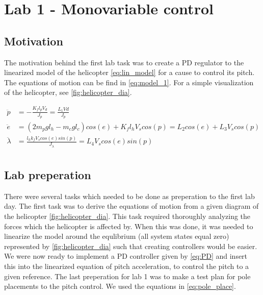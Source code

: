 \section{Lab 1 - Monovariable control}
\subsection{Motivation}\label{sec:lab1_mot}
The motivation behind the first lab task was to create a PD regulator to the linearized
model of the helicopter \ref{eq:lin_model} for a cause to control its pitch. The equations
of motion can be find in \ref{eq:model_1}. For a simple visualization of the helicopter, see \ref{fig:helicopter_dia}.

\begin{subequations}\label{eq:model_1}
	\begin{align}
		\ddot{p}  &= -\frac{K_{f}l_{p}V_{d}}{J_{p}} = \frac{L_1Vd}{J_p} \label{eq:model_1_p} \\
		\ddot{e}  &= (2m_pgl_h-m_cgl_c)cos(e)+K_fl_hV_scos(p) = L_2cos(e)+L_3V_scos(p)\label{eq:model_1_e} \\
		\ddot{\lambda} &= \frac{l_hk_fV_scos(e)sin(p)}{J_{\lambda}} = L_4V_scos(e)sin(p) \label{eq:model_1_l} \\
	\end{align}
\end{subequations}

\subsection{Lab preperation}\label{sec:lab1_prep}
There were several tasks which needed to be done as preperation to the first lab day.
The first task was to derive the equations of motion from a given diagram of the helicopter \ref{fig:helicopter_dia}.
This task required thoroughly analyzing the forces which the helicopter is affected by.
When this was done, it was needed to linearize the model around the equlibrium (all system states equal zero) represented by \ref{fig:helicopter_dia} such that 
creating controllers would be easier. We were now ready to implement a PD controller given by \ref{eq:PD}
and insert this into the linearized equation of pitch acceleration, to control the pitch to a given reference.
The last preperation for lab 1 was to make a test plan for pole placements to the pitch control. We used the equations in \ref{eq:pole_place}.

